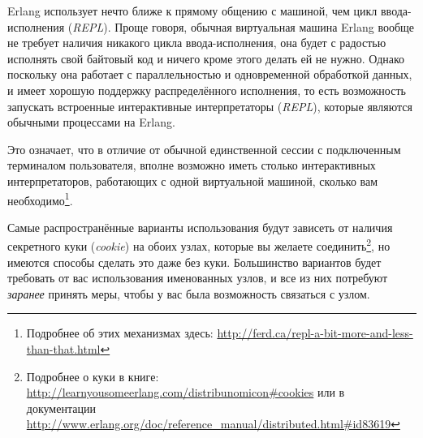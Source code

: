 \documentclass[11pt, oneside]{book}   	%
\begin{document}
Erlang использует нечто ближе к прямому общению с машиной, чем цикл ввода-исполнения (\emph{REPL}). Проще говоря, обычная виртуальная машина Erlang вообще не требует наличия никакого цикла ввода-исполнения, она будет с радостью исполнять свой байтовый код и ничего кроме этого делать ей не нужно. Однако поскольку она работает с параллельностью и одновременной обработкой данных, и имеет хорошую поддержку распределённого исполнения, то есть возможность запускать встроенные интерактивные интерпретаторы (\emph{REPL}), которые являются обычными процессами на Erlang.

Это означает, что в отличие от обычной единственной сессии с подключенным терминалом пользователя, вполне возможно иметь столько интерактивных интерпретаторов, работающих с одной виртуальной машиной, сколько вам необходимо\footnote{Подробнее об этих механизмах здесь: \href{http://ferd.ca/repl-a-bit-more-and-less-than-that.html}{http://ferd.ca/repl-a-bit-more-and-less-than-that.html}}.

Самые распространённые варианты использования будут зависеть от наличия секретного куки (\emph{cookie}) на обоих узлах, которые вы желаете соединить\footnote{Подробнее о куки в книге: \href{http://learnyousomeerlang.com/distribunomicon\#cookies}{http://learnyousomeerlang.com/distribunomicon\#cookies} или в документации
\href{http://www.erlang.org/doc/reference\_manual/distributed.html\#id83619}{http://www.erlang.org/doc/reference\_manual/distributed.html\#id83619}}, но имеются способы сделать это даже без куки. Большинство вариантов будет требовать от вас использования именованных узлов, и все из них потребуют \emph{заранее} принять меры, чтобы у вас была возможность связаться с узлом. 
\end{document}

